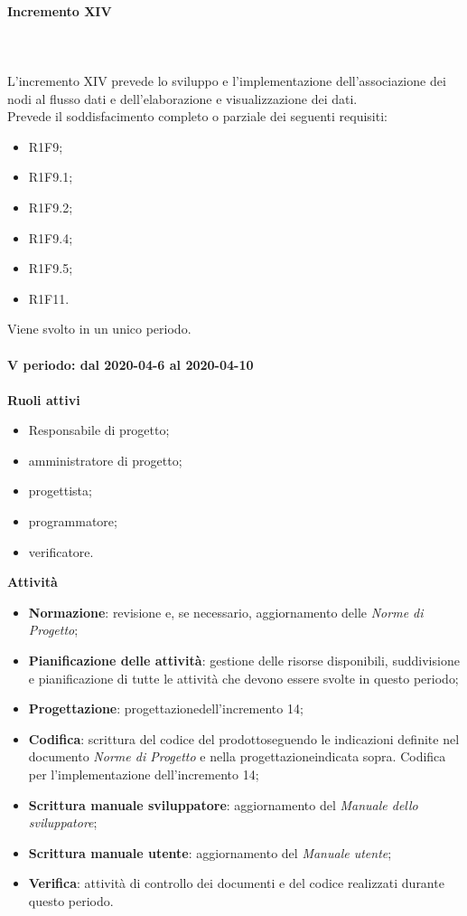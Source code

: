 \paragraph{Incremento XIV} \mbox{} \\ \\
L'incremento XIV prevede lo sviluppo e l'implementazione dell'associazione dei nodi al flusso dati e dell'elaborazione e visualizzazione dei dati.
\\Prevede il soddisfacimento completo o parziale dei seguenti requisiti:
\begin{itemize}
	\item R1F9;
	\item R1F9.1;
	\item R1F9.2;
	\item R1F9.4;
	\item R1F9.5;
	\item R1F11.
\end{itemize}
Viene svolto in un unico periodo.
\mbox{} \\ \\ \textbf{V periodo: dal 2020-04-6 al 2020-04-10} \mbox{} \\ \\
\textbf{Ruoli attivi}
\begin{itemize}
	\item Responsabile di progetto\glo;
	\item amministratore di progetto\glo;
	\item progettista;
	\item programmatore;
	\item verificatore.
\end{itemize}
\textbf{Attività} 
\begin{itemize}
	\item \textbf{Normazione}: revisione e, se necessario, aggiornamento delle \textit{Norme di Progetto};
	\item \textbf{Pianificazione delle attività}: gestione delle risorse disponibili, suddivisione e pianificazione di tutte le attività che devono essere svolte in questo periodo;
	\item \textbf{Progettazione}\glo: progettazione\glosp dell'incremento 14;  
	\item \textbf{Codifica}: scrittura del codice del prodotto\glosp seguendo le indicazioni definite nel documento \textit{Norme di Progetto} e nella progettazione\glosp indicata sopra. Codifica per l'implementazione dell'incremento 14;
	\item \textbf{Scrittura manuale sviluppatore}: aggiornamento del \textit{Manuale dello sviluppatore};
	\item \textbf{Scrittura manuale utente}: aggiornamento del \textit{Manuale utente};
	\item \textbf{Verifica}: attività di controllo dei documenti e del codice realizzati durante questo periodo.
\end{itemize}
